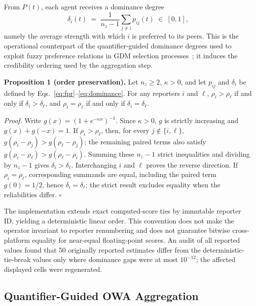 \documentclass[smartcities,article,submit,moreauthors]{Definitions/mdpi}
\begin{document}
From $P(t)$, each agent receives a dominance degree
\begin{equation}
\delta_i(t)\;=\;\frac{1}{n_z-1}\sum_{j\neq i} p_{ij}(t)\;\in\;[0,1],
\label{eq:dominance}
\end{equation}
namely the average strength with which $i$ is preferred to its peers.
This is the operational counterpart of the quantifier-guided dominance
degrees used to exploit fuzzy preference relations in GDM selection
processes~\cite{chiclana1998,herreraviedma2002}; it induces the
credibility ordering used by the aggregation step.

\textbf{Proposition 1 (order preservation).}
Let $n_z\geq2$, $\kappa>0$, and let $p_{ij}$ and $\delta_i$ be defined by
Eqs.~\eqref{eq:fpr}--\eqref{eq:dominance}. For any reporters $i$ and
$\ell$, $\rho_i>\rho_\ell$ if and only if
$\delta_i>\delta_\ell$, and $\rho_i=\rho_\ell$ if and only if
$\delta_i=\delta_\ell$.

\emph{Proof.} Write $g(x)=(1+e^{-\kappa x})^{-1}$. Since $\kappa>0$,
$g$ is strictly increasing and $g(x)+g(-x)=1$. If
$\rho_i>\rho_\ell$, then, for every $j\notin\{i,\ell\}$,
$g(\rho_i-\rho_j)>g(\rho_\ell-\rho_j)$; the remaining paired terms also
satisfy $g(\rho_i-\rho_\ell)>g(\rho_\ell-\rho_i)$. Summing these
$n_z-1$ strict inequalities and dividing by $n_z-1$ gives
$\delta_i>\delta_\ell$. Interchanging $i$ and $\ell$ proves the reverse
direction. If $\rho_i=\rho_\ell$, corresponding summands are equal,
including the paired term $g(0)=1/2$, hence
$\delta_i=\delta_\ell$; the strict result excludes equality when the
reliabilities differ. $\square$

The implementation extends exact computed-score ties by immutable reporter
ID, yielding a deterministic linear order. This convention does not make the
operator invariant to reporter renumbering and does not guarantee bitwise
cross-platform equality for near-equal floating-point scores. An
audit of all reported values found that 50 originally reported estimates differ
from the deterministic-tie-break values only where dominance gaps were at most
$10^{-12}$; the affected displayed cells were regenerated.

\subsection{Quantifier-Guided OWA Aggregation}
\label{sec:fprowa}
\end{document}
